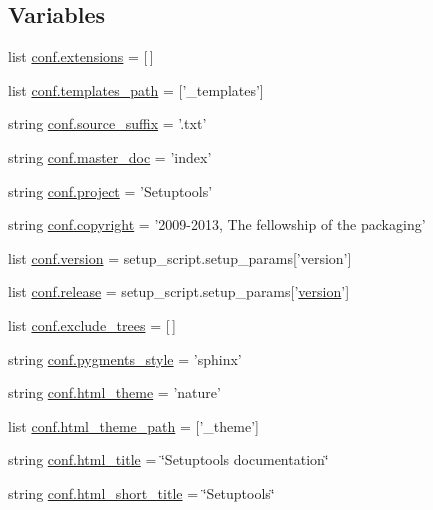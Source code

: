\subsection*{Variables}
\begin{DoxyCompactItemize}
\item 
list \hyperlink{namespaceconf_a540efa67c53e84c1c353c1df2e37e39c}{conf.\+extensions} = \mbox{[}$\,$\mbox{]}
\item 
list \hyperlink{namespaceconf_af50129dcc1f90655539f025595a3093b}{conf.\+templates\+\_\+path} = \mbox{[}'\+\_\+templates'\mbox{]}
\item 
string \hyperlink{namespaceconf_a1e0ba7f4cb1d50fa831f1236a77d60f6}{conf.\+source\+\_\+suffix} = '.txt'
\item 
string \hyperlink{namespaceconf_ae22a29d94a222730836db739d6dbd71e}{conf.\+master\+\_\+doc} = 'index'
\item 
string \hyperlink{namespaceconf_aa2c6aefbed1597a70cfb45a760e5977c}{conf.\+project} = 'Setuptools'
\item 
string \hyperlink{namespaceconf_ac8ccf456b321bc9052c0691a173b6925}{conf.\+copyright} = '2009-\/2013, The fellowship of the packaging'
\item 
list \hyperlink{namespaceconf_ae6c322f623b44d2a866d51d0b645d3d2}{conf.\+version} = setup\+\_\+script.\+setup\+\_\+params\mbox{[}'version'\mbox{]}
\item 
list \hyperlink{namespaceconf_a90a599726178800ad5a42f6bc2cd5208}{conf.\+release} = setup\+\_\+script.\+setup\+\_\+params\mbox{[}'\hyperlink{constants_8h_a6418e155daa9be25a885791f11c31dbe}{version}'\mbox{]}
\item 
list \hyperlink{namespaceconf_aa8a9845f7e0bc1a109b463c6efe6db86}{conf.\+exclude\+\_\+trees} = \mbox{[}$\,$\mbox{]}
\item 
string \hyperlink{namespaceconf_afa4e4ed164119ef5f4656e9554ed1f1b}{conf.\+pygments\+\_\+style} = 'sphinx'
\item 
string \hyperlink{namespaceconf_a7f1b143ff25817758abd21a7db110510}{conf.\+html\+\_\+theme} = 'nature'
\item 
list \hyperlink{namespaceconf_a98891f2e4a5d0fc6e8cbe787fb9c2439}{conf.\+html\+\_\+theme\+\_\+path} = \mbox{[}'\+\_\+theme'\mbox{]}
\item 
string \hyperlink{namespaceconf_a21723aa72b000ec08ec9fdab86bddebb}{conf.\+html\+\_\+title} = \char`\"{}Setuptools documentation\char`\"{}
\item 
string \hyperlink{namespaceconf_ad2add41c6043d1066cc180e8d57cc4da}{conf.\+html\+\_\+short\+\_\+title} = \char`\"{}Setuptools\char`\"{}

\end{DoxyCompactItemize}
